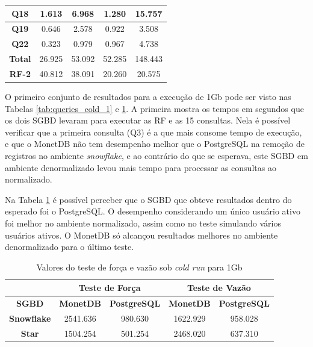 \begin{table}[htpb]
\begin{tabular}{|c|c|c|c|c|}
        \textbf{Q18}   & 1.613             & 6.968               & 1.280          & 15.757            \\ \hline
        \textbf{Q19}   & 0.646             & 2.578               & 0.922          & 3.508             \\ \hline
        \textbf{Q22}   & 0.323             & 0.979               & 0.967          & 4.738             \\ \hline
        \textbf{Total} & 26.925            & 53.092              & 52.285         & 148.443           \\ \hline
        \textbf{RF-2}  & 40.812            & 38.091              & 20.260         & 20.575            \\ \hline
        \end{tabular}
        \end{table}

O primeiro conjunto de resultados para a execução de 1Gb pode ser visto nas Tabelas \ref{tab:queries_cold_1} e \ref{tab:forca_vazao_cold_1}. A primeira mostra os tempos em segundos que os dois SGBD levaram para executar as RF e as 15 consultas. Nela é possível verificar que a primeira consulta (Q3) é a que mais consome tempo de execução, e que o MonetDB não tem desempenho melhor que o PostgreSQL na remoção de registros no ambiente \textit{snowflake}, e ao contrário do que se esperava, este SGBD em ambiente denormalizado levou mais tempo para processar as consultas ao normalizado. 

Na Tabela \ref{tab:forca_vazao_cold_1} é possível perceber que o SGBD que obteve resultados dentro do esperado foi o PostgreSQL. O desempenho considerando um único usuário ativo foi melhor no ambiente normalizado, assim como no teste simulando vários usuários ativos. O MonetDB só alcançou resultados melhores no ambiente denormalizado para o último teste.

\begin{table}[htpb]
        \centering
        \caption{Valores do teste de força e vazão sob \textit{cold run} para 1Gb}
        \label{tab:forca_vazao_cold_1}
        \begin{tabular}{|c|c|c|c|c|}
        \hline
                                & \multicolumn{2}{c|}{\textbf{Teste de Força}} & \multicolumn{2}{c|}{\textbf{Teste de Vazão}} \\ \hline
        \textbf{SGBD}      & \textbf{MonetDB}    & \textbf{PostgreSQL}    & \textbf{MonetDB}    & \textbf{PostgreSQL}    \\ \hline
        \textbf{Snowflake} & 2541.636            & 980.630                & 1622.929            & 958.028                \\ \hline
        \textbf{Star}      & 1504.254            & 501.254                & 2468.020            & 637.310                \\ \hline
        \end{tabular}
\end{table}

